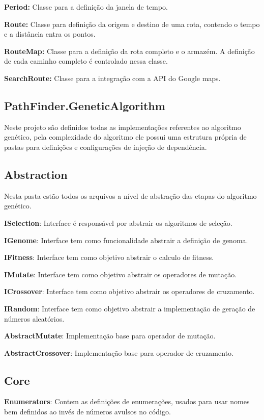 \textbf{Period:} Classe para a definição da janela de tempo.

\textbf{Route:} Classe para definição da origem e destino de uma rota, contendo o tempo e a distância entra os pontos.

\textbf{RouteMap:} Classe para a definição da rota completo e o armazém. A definição de cada caminho completo é controlado nessa classe. 

\textbf{SearchRoute:} Classe para a integração com a API do Google maps.

\subsection{PathFinder.GeneticAlgorithm}
Neste projeto são definidos todas as implementações referentes ao algoritmo genético, pela complexidade do algoritmo ele possui uma estrutura própria de pastas para definições e configurações de injeção de dependência.

\subsection{Abstraction}

Nesta pasta estão todos os arquivos a nível de abstração das etapas do algoritmo genético.

\textbf{ISelection}: Interface é responsável por abstrair os algoritmos de seleção.

\textbf{IGenome}: Interface tem como funcionalidade abstrair a definição de genoma.

\textbf{IFitness}: Interface tem como objetivo abstrair o calculo de fitness.

\textbf{IMutate}: Interface tem como objetivo abstrair os operadores de mutação.

\textbf{ICrossover}:  Interface tem como objetivo abstrair os operadores de cruzamento.

\textbf{IRandom}: Interface tem como objetivo abstrair a implementação de geração de números aleatórios.

\textbf{AbstractMutate}: Implementação base para operador de mutação.

\textbf{AbstractCrossover}: Implementação base para operador de cruzamento.

\subsection{Core}

\textbf{Enumerators}: Contem as definições de enumerações, usados para usar nomes bem definidos ao invés de números avulsos no código.

